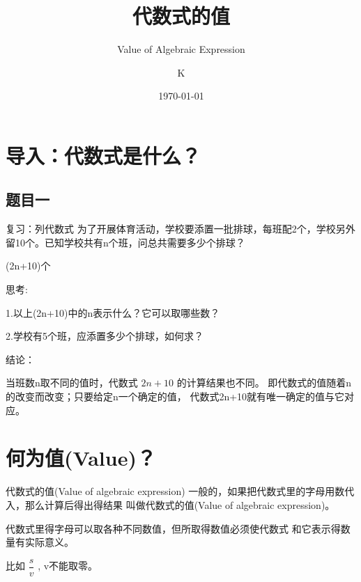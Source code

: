 \documentclass{beamer}
\title{代数式的值}
\subtitle{Value of Algebraic Expression}
\institute{Norsesun Milieu}
\author{K}
\date{\today}
\begin{document}
	\frame{\titlepage}
	
	\section{导入：代数式是什么？}
	\subsection{题目一}
	\begin{frame}{复习：列代数式}
		为了开展体育活动，学校要添置一批排球，每班配2个，学校另外
		留10个。已知学校共有n个班，问总共需要多少个排球？
		\pause
		
		(2n+10)个
	\end{frame}
	
	\begin{frame}{思考:}
			
				1.以上(2n+10)中的n表示什么？它可以取哪些数？
				
				2.学校有5个班，应添置多少个排球，如何求？
	\end{frame}
	
	\begin{frame}{结论：}
			
			当班数n取不同的值时，代数式 $2n+10$ 的计算结果也不同。
			即代数式的值随着n的改变而改变；只要给定n一个确定的值，
			代数式2n+10就有唯一确定的值与它对应。
	\end{frame}
	
	\section{何为值(Value)？}
	\begin{frame}{代数式的值(Value of algebraic expression)}
		一般的，如果把代数式里的字母用数代入，那么计算后得出得结果
		叫做代数式的值(Value of algebraic expression)。
		
		代数式里得字母可以取各种不同数值，但所取得数值必须使代数式
		和它表示得数量有实际意义。

		比如 $ \dfrac{s}{v} $ , v不能取零。
	\end{frame}
	
\end{document}
